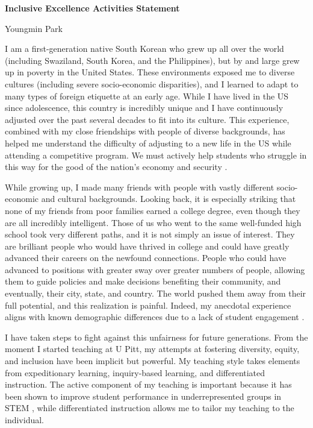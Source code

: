 \documentclass[a4paper,11pt]{article}
\begin{document}
\begin{center}
\Large \textbf{Inclusive Excellence Activities Statement}

\Large Youngmin Park
\end{center}

I am a first-generation native South Korean who grew up all over the world (including Swaziland, South Korea, and the Philippines), but by and large grew up in poverty in the United States. These environments exposed me to diverse cultures (including severe socio-economic disparities), and I learned to adapt to many types of foreign etiquette at an early age. While I have lived in the US since adolescence, this country is incredibly unique and I have continuously adjusted over the past several decades to fit into its culture. This experience, combined with my close friendships with people of diverse backgrounds, has helped me understand the difficulty of adjusting to a new life in the US while attending a competitive program. We must actively help students who struggle in this way for the good of the nation's economy and security \cite{jones2018call}.

While growing up, I made many friends with people with vastly different socio-economic and cultural backgrounds. Looking back, it is especially striking that none of my friends from poor families earned a college degree, even though they are all incredibly intelligent. Those of us who went to the same well-funded high school took very different paths, and it is not simply an issue of interest. They are brilliant people who would have thrived in college and could have greatly advanced their careers on the newfound connections. People who could have advanced to positions with greater sway over greater numbers of people, allowing them to guide policies and make decisions benefiting their community, and eventually, their city, state, and country. The world pushed them away from their full potential, and this realization is painful. Indeed, my anecdotal experience aligns with known demographic differences \cite{jones2018call} due to a lack of student engagement \cite{kokkelenberg2010succeeds,savaria2017critical}.

I have taken steps to fight against this unfairness for future generations. From the moment I started teaching at U Pitt, my attempts at fostering diversity, equity, and inclusion have been implicit but powerful. My teaching style takes elements from expeditionary learning, inquiry-based learning, and differentiated instruction. The active component of my teaching is important because it has been shown to improve student performance in underrepresented groups in STEM \cite{theobald2020active}, while differentiated instruction allows me to tailor my teaching to the individual.
\end{document}
